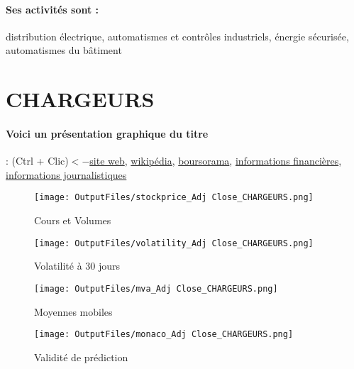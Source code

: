 \documentclass[11pt,a4paper]{report}%
\begin{document}
\paragraph{Ses activités sont : } distribution électrique, automatismes et contrôles industriels, énergie sécurisée, automatismes du bâtiment  
    
    \newpage

\section{CHARGEURS}

\paragraph{Voici un présentation graphique du titre} : (Ctrl + Clic)$<-$\href{https://www.chargeurs.com/le-groupe/}{site web}, \href{https://fr.wikipedia.org/wiki/Chargeurs}{wikipédia}, \href{https://www.boursorama.com/cours/1rPCRI}{boursorama}, \href{https://www.qwant.com/?q=site:https:%2f%2fwww.easybourse.com%2faction-societe%2fCHARGEURS&t=web&client=ext-firefox-hp}{informations financières}, \href{https://bourse.lerevenu.com/cours-de-bourse/fiche-valeur-synthese/CHARGEURS/CRI-FR}{informations journalistiques}
\begin{figure}[!htb]
   \begin{minipage}{0.5\textwidth}
     \centering
     \texttt{[image: OutputFiles/stockprice\_Adj Close\_CHARGEURS.png]}
     \caption{Cours et Volumes}\label{Fig:price_CHARGEURS}
   \end{minipage}\hfill
   \begin{minipage}{0.5\textwidth}
     \centering
     \texttt{[image: OutputFiles/volatility\_Adj Close\_CHARGEURS.png]}
     \caption{Volatilité à 30 jours}\label{Fig:volat_CHARGEURS}
   \end{minipage}
\end{figure}
\begin{figure}[!htb]
   \begin{minipage}{0.5\textwidth}
     \centering
     \texttt{[image: OutputFiles/mva\_Adj Close\_CHARGEURS.png]}
     \caption{Moyennes mobiles}\label{Fig:mva_CHARGEURS}
   \end{minipage}\hfill
   \begin{minipage}{0.5\textwidth}
     \centering
     \texttt{[image: OutputFiles/monaco\_Adj Close\_CHARGEURS.png]}
     \caption{Validité de prédiction}\label{Fig:prediction_CHARGEURS}
   \end{minipage}
\end{figure}
\end{document}
